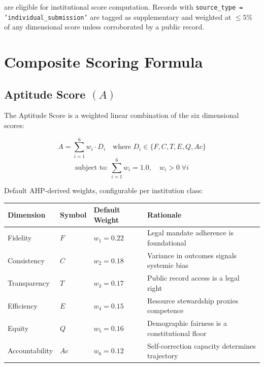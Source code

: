 \documentclass[a4paper,11pt]{article}
\begin{document}
	\noindent are eligible for institutional score computation. Records with \texttt{source\_type = 'individual\_submission'} are tagged as supplementary and weighted at $\leq 5\%$ of any dimensional score unless corroborated by a public record.
	
	\section{Composite Scoring Formula}
	
	\subsection{Aptitude Score \texorpdfstring{$(A)$}{(A)}}
	
	The Aptitude Score is a weighted linear combination of the six dimensional scores:
	
	\[
	A = \sum_{i=1}^{6} w_i \cdot D_i \quad \text{where } D_i \in \{F, C, T, E, Q, Ac\}
	\]
	\[
	\text{subject to: } \sum_{i=1}^{6} w_i = 1.0, \quad w_i > 0 \; \forall i
	\]
	
	\medskip
	\noindent Default AHP-derived weights, configurable per institution class:
	
	\bigskip
	\begin{center}
		\begin{tabular}{L{3.8cm} C{1.4cm} C{2.4cm} L{6.0cm}}
			\toprule
			\color{white}\textbf{\sffamily Dimension} & \color{white}\textbf{\sffamily Symbol} & \color{white}\textbf{\sffamily Default Weight} & \color{white}\textbf{\sffamily Rationale} \\
			\midrule
			Fidelity       & $F$   & $w_1 = 0.22$ & Legal mandate adherence is foundational \\
			Consistency    & $C$   & $w_2 = 0.18$ & Variance in outcomes signals systemic bias \\
			Transparency   & $T$   & $w_3 = 0.17$ & Public record access is a legal right \\
			Efficiency     & $E$   & $w_4 = 0.15$ & Resource stewardship proxies competence \\
			Equity         & $Q$   & $w_5 = 0.16$ & Demographic fairness is a constitutional floor \\
			Accountability & $Ac$  & $w_6 = 0.12$ & Self-correction capacity determines trajectory \\
			\bottomrule
		\end{tabular}
	\end{center}
	
\end{document}

